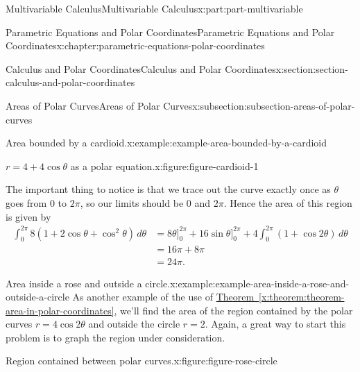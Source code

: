 \documentclass[twoside,10pt,]{tufte-book}
\newcommand{\xreffont}{\relax}
\numberwithin{equation}{part}
\newcommand{\amp}{&}
\begin{document}
\begin{partptx}{Multivariable Calculus}{}{Multivariable Calculus}{}{}{x:part:part-multivariable}
\begin{chapterptx}{Parametric Equations and Polar Coordinates}{}{Parametric Equations and Polar Coordinates}{}{}{x:chapter:parametric-equations-polar-coordinates}
\begin{sectionptx}{Calculus and Polar Coordinates}{}{Calculus and Polar Coordinates}{}{}{x:section:section-calculus-and-polar-coordinates}
\begin{subsectionptx}{Areas of Polar Curves}{}{Areas of Polar Curves}{}{}{x:subsection:subsection-areas-of-polar-curves}
\begin{example}{Area bounded by a cardioid.}{x:example:example-area-bounded-by-a-cardioid}
\begin{figureptx}{\(r = 4 + 4\cos\theta\) as a polar equation.}{x:figure:figure-cardioid-1}{}
\begin{image}{0}{1}{0}
{
}%
\end{image}%
\tcblower
\end{figureptx}%
The important thing to notice is that we trace out the curve exactly once as \(\theta\) goes from \(0\) to \(2\pi\), so our limits should be \(0\) and \(2\pi\). Hence the area of this region is given by%
%
\begin{align*}
\int_{0}^{2\pi}8(1+2\cos\theta+\cos^{2}\theta)\,d\theta \amp = 8\theta\Big]_{0}^{2\pi} + 16\sin\theta\Big]_{0}^{2\pi} + 4\int_{0}^{2\pi}(1+\cos2\theta)\,d\theta \\
\amp = 16\pi + 8\pi \\
\amp = 24\pi. 
\end{align*}
\end{example}
%
\begin{example}{Area inside a rose and outside a circle.}{x:example:example-area-inside-a-rose-and-outside-a-circle}%
As another example of the use of \hyperref[x:theorem:theorem-area-in-polar-coordinates]{Theorem~{\xreffont\ref{x:theorem:theorem-area-in-polar-coordinates}}}, we'll find the area of the region contained by the polar curves \(r = 4\cos2\theta\) and outside the circle \(r=2\). Again, a great way to start this problem is to graph the region under consideration.%
\begin{figureptx}{Region contained between polar curves.}{x:figure:figure-rose-circle}{}%
\begin{image}{0}{1}{0}%
\resizebox{\linewidth}{!}{%
\begin{tikzpicture}[scale=.5]


\end{tikzpicture}}
\end{image}
\end{figureptx}
\end{example}
\end{subsectionptx}
\end{sectionptx}
\end{chapterptx}
\end{partptx}
\end{document}
